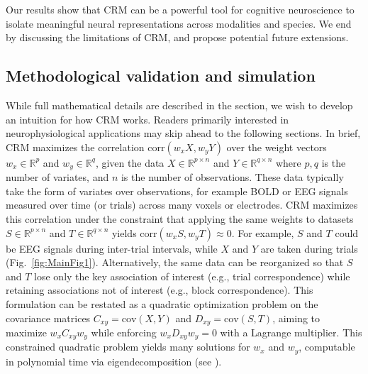 \documentclass{article}
\newcommand{\R}{\mathbb{R}}
\begin{document}
Our results show that CRM can be a powerful tool for cognitive neuroscience to isolate meaningful neural representations across modalities and species. We end by discussing the limitations of CRM, and propose potential future extensions.


\subsection*{Methodological validation and simulation}

While full mathematical details are described in the  section, we wish to develop an intuition for how CRM works. Readers primarily interested in neurophysiological applications may skip ahead to the following sections. In brief, CRM maximizes the correlation $\text{corr}(w_xX,w_yY)$ over the weight vectors $w_x\in\R^{p}$ and $w_y\in\R^{q}$, given the data $X\in\R^{p\times n}$ and $Y\in\R^{q\times n}$ where $p,q$ is the number of variates, and $n$ is the number of observations. These data typically take the form of variates over observations, for example BOLD or EEG signals measured over time (or trials) across many voxels or electrodes. CRM maximizes this correlation under the constraint that applying the same weights to datasets $S\in\R^{p\times n}$ and $T\in\R^{q\times n}$ yields $\text{corr}(w_xS,w_yT)\approx 0$. For example, $S$ and $T$ could be EEG signals during inter-trial intervals, while $X$ and $Y$ are taken during trials (Fig.~\ref{fig:MainFig1}). Alternatively, the same data can be reorganized so that $S$ and $T$ lose only the key association of interest (e.g., trial correspondence) while retaining associations not of interest (e.g., block correspondence). This formulation can be restated as a quadratic optimization problem on the covariance matrices $C_{xy}=\text{cov}(X,Y)$ and $D_{xy}=\text{cov}(S,T)$, aiming to maximize $w_xC_{xy}w_y$ while enforcing $w_xD_{xy}w_y=0$ with a
Lagrange multiplier. This constrained quadratic problem yields many solutions for $w_x$ and $w_y$, computable in polynomial time via eigendecomposition (see ).
\end{document}
